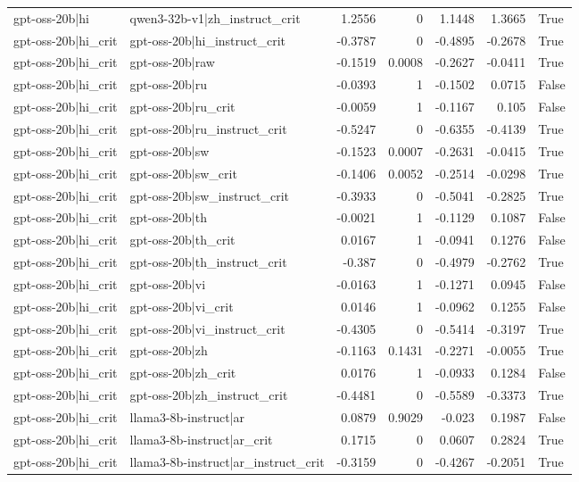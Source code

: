 \begin{table}
\begin{tabular}{l l r r r r l}
gpt-oss-20b|hi & qwen3-32b-v1|zh_instruct_crit & 1.2556 & 0 & 1.1448 & 1.3665 & True \\
gpt-oss-20b|hi_crit & gpt-oss-20b|hi_instruct_crit & -0.3787 & 0 & -0.4895 & -0.2678 & True \\
gpt-oss-20b|hi_crit & gpt-oss-20b|raw & -0.1519 & 0.0008 & -0.2627 & -0.0411 & True \\
gpt-oss-20b|hi_crit & gpt-oss-20b|ru & -0.0393 & 1 & -0.1502 & 0.0715 & False \\
gpt-oss-20b|hi_crit & gpt-oss-20b|ru_crit & -0.0059 & 1 & -0.1167 & 0.105 & False \\
gpt-oss-20b|hi_crit & gpt-oss-20b|ru_instruct_crit & -0.5247 & 0 & -0.6355 & -0.4139 & True \\
gpt-oss-20b|hi_crit & gpt-oss-20b|sw & -0.1523 & 0.0007 & -0.2631 & -0.0415 & True \\
gpt-oss-20b|hi_crit & gpt-oss-20b|sw_crit & -0.1406 & 0.0052 & -0.2514 & -0.0298 & True \\
gpt-oss-20b|hi_crit & gpt-oss-20b|sw_instruct_crit & -0.3933 & 0 & -0.5041 & -0.2825 & True \\
gpt-oss-20b|hi_crit & gpt-oss-20b|th & -0.0021 & 1 & -0.1129 & 0.1087 & False \\
gpt-oss-20b|hi_crit & gpt-oss-20b|th_crit & 0.0167 & 1 & -0.0941 & 0.1276 & False \\
gpt-oss-20b|hi_crit & gpt-oss-20b|th_instruct_crit & -0.387 & 0 & -0.4979 & -0.2762 & True \\
gpt-oss-20b|hi_crit & gpt-oss-20b|vi & -0.0163 & 1 & -0.1271 & 0.0945 & False \\
gpt-oss-20b|hi_crit & gpt-oss-20b|vi_crit & 0.0146 & 1 & -0.0962 & 0.1255 & False \\
gpt-oss-20b|hi_crit & gpt-oss-20b|vi_instruct_crit & -0.4305 & 0 & -0.5414 & -0.3197 & True \\
gpt-oss-20b|hi_crit & gpt-oss-20b|zh & -0.1163 & 0.1431 & -0.2271 & -0.0055 & True \\
gpt-oss-20b|hi_crit & gpt-oss-20b|zh_crit & 0.0176 & 1 & -0.0933 & 0.1284 & False \\
gpt-oss-20b|hi_crit & gpt-oss-20b|zh_instruct_crit & -0.4481 & 0 & -0.5589 & -0.3373 & True \\
gpt-oss-20b|hi_crit & llama3-8b-instruct|ar & 0.0879 & 0.9029 & -0.023 & 0.1987 & False \\
gpt-oss-20b|hi_crit & llama3-8b-instruct|ar_crit & 0.1715 & 0 & 0.0607 & 0.2824 & True \\
gpt-oss-20b|hi_crit & llama3-8b-instruct|ar_instruct_crit & -0.3159 & 0 & -0.4267 & -0.2051 & True \\

\end{tabular}
\end{table}
